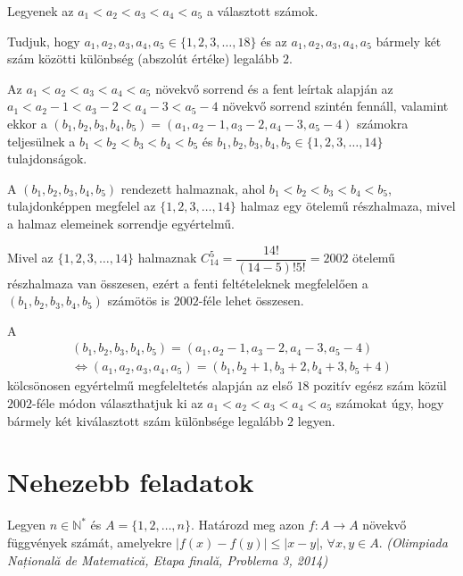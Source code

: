 \begin{solution}
Legyenek az $a_{1}<a_{2}<a_{3}<a_{4}<a_{5}$ a választott számok.

Tudjuk, hogy $a_{1},a_{2},a_{3},a_{4},a_{5}\in\{1,2,3,\ldots,18\}$
és az $a_{1},a_{2},a_{3},a_{4},a_{5}$ bármely két szám közötti különbség
(abszolút értéke) legalább $2$.

Az $a_{1}<a_{2}<a_{3}<a_{4}<a_{5}$ növekvő sorrend és a fent leírtak
alapján az $a_{1}<a_{2}-1<a_{3}-2<a_{4}-3<a_{5}-4$ növekvő sorrend
szintén fennáll, valamint ekkor a $(b_{1},b_{2},b_{3},b_{4},b_{5})=(a_{1},a_{2}-1,a_{3}-2,a_{4}-3,a_{5}-4)$
számokra teljesülnek a $b_{1}<b_{2}<b_{3}<b_{4}<b_{5}$ és $b_{1},b_{2},b_{3},b_{4},b_{5}\in\{1,2,3,\ldots,14\}$
tulajdonságok.

A $(b_{1},b_{2},b_{3},b_{4},b_{5})$ rendezett halmaznak, ahol $b_{1}<b_{2}<b_{3}<b_{4}<b_{5}$,
tulajdonképpen megfelel az $\{1,2,3,\ldots,14\}$ halmaz egy ötelemű
részhalmaza, mivel a halmaz elemeinek sorrendje egyértelmű.

Mivel az $\{1,2,3,\ldots,14\}$ halmaznak $C_{14}^{5}=\dfrac{14!}{(14-5)!5!}=2002$
ötelemű részhalmaza van összesen, ezért a fenti feltételeknek megfelelően
a $(b_{1},b_{2},b_{3},b_{4},b_{5})$ számötös is $2002$-féle lehet
összesen.

A 
\[
\begin{array}{c}
(b_{1},b_{2},b_{3},b_{4},b_{5})=(a_{1},a_{2}-1,a_{3}-2,a_{4}-3,a_{5}-4)\\
\Leftrightarrow(a_{1},a_{2},a_{3},a_{4},a_{5})=(b_{1},b_{2}+1,b_{3}+2,b_{4}+3,b_{5}+4)
\end{array}
\]
kölcsönosen egyértelmű megfeleltetés alapján az első $18$ pozitív
egész szám közül $2002$-féle módon választhatjuk ki az $a_{1}<a_{2}<a_{3}<a_{4}<a_{5}$
számokat úgy, hogy bármely két kiválasztott szám különbsége legalább
$2$ legyen. 
\end{solution}

\section*{Nehezebb feladatok}
\begin{extraproblem}
Legyen $n\in\mathbb{N}^{*}$ és $A=\{1,2,\dots,n\}$. Határozd meg
azon $f:A\to A$ növekvő függvények számát, amelyekre $|f(x)-f(y)|\leq|x-y|$,
$\forall x,y\in A$. \emph{(Olimpiada Națională de Matematică, Etapa
finală, Problema 3, 2014)}
\end{extraproblem}

